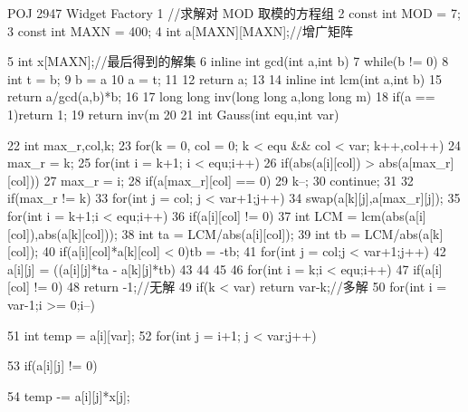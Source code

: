 \documentclass[11pt]{article}
\begin{document}
\begin{Code}
      POJ 2947 Widget Factory
 1    //求解对 MOD 取模的方程组
 2    const int MOD = 7;
 3    const int MAXN = 400;
 4    int a[MAXN][MAXN];//增广矩阵


 5   int x[MAXN];//最后得到的解集
 6   inline int gcd(int a,int b){
 7       while(b != 0){
 8           int t = b;
 9           b = a%
10           a = t;
11       }
12       return a;
13   }
14   inline int lcm(int a,int b){
15       return a/gcd(a,b)*b;
16   }
17   long long inv(long long a,long long m){
18       if(a == 1)return 1;
19       return inv(m%
20   }
21   int Gauss(int equ,int var){
22       int max_r,col,k;
23       for(k = 0, col = 0; k < equ && col < var; k++,col++){
24           max_r = k;
25           for(int i = k+1; i < equ;i++)
26               if(abs(a[i][col]) > abs(a[max_r][col]))
27                    max_r = i;
28           if(a[max_r][col] == 0){
29               k--;
30               continue;
31           }
32           if(max_r != k)
33               for(int j = col; j < var+1;j++)
34                    swap(a[k][j],a[max_r][j]);
35           for(int i = k+1;i < equ;i++){
36               if(a[i][col] != 0){
37                    int LCM = lcm(abs(a[i][col]),abs(a[k][col]));
38                    int ta = LCM/abs(a[i][col]);
39                    int tb = LCM/abs(a[k][col]);
40                    if(a[i][col]*a[k][col] < 0)tb = -tb;
41                    for(int j = col;j < var+1;j++)
42                        a[i][j] = ((a[i][j]*ta - a[k][j]*tb)%
43               }
44           }
45       }
46       for(int i = k;i < equ;i++)
47           if(a[i][col] != 0)
48               return -1;//无解
49       if(k < var) return var-k;//多解
50       for(int i = var-1;i >= 0;i--){
51           int temp = a[i][var];
52           for(int j = i+1; j < var;j++){
53               if(a[i][j] != 0){
54                    temp -= a[i][j]*x[j];


}}}}
\end{Code}
\end{document}
